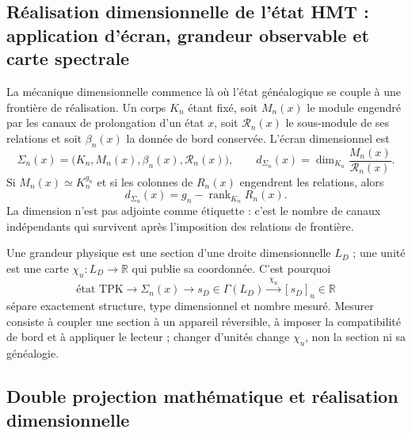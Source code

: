 {\subsection{Réalisation dimensionnelle de l'état HMT : application d'écran, grandeur observable et carte spectrale}

La mécanique dimensionnelle commence là où l'état généalogique se couple à une
frontière de réalisation. Un corps \(K_n\) étant fixé, soit \(M_n(x)\) le module
engendré par les canaux de prolongation d'un état \(x\), soit
\(\mathcal R_n(x)\) le sous-module de ses relations et soit \(\beta_n(x)\) la
donnée de bord conservée. L'écran dimensionnel est
\begin{equation}
\Sigma_n(x)=\bigl(K_n,M_n(x),\beta_n(x),\mathcal R_n(x)\bigr),
\qquad
d_{\Sigma_n}(x)=\dim_{K_n}\frac{M_n(x)}{\mathcal R_n(x)}.
\label{p12-83-c3-s1:eq:md-screen}
\end{equation}
Si \(M_n(x)\simeq K_n^{g_n}\) et si les colonnes de \(R_n(x)\) engendrent les
relations, alors
\begin{equation}
\boxed{d_{\Sigma_n}(x)=g_n-\operatorname{rank}_{K_n}R_n(x).}
\label{p12-83-c3-s1:eq:md-rank}
\end{equation}
La dimension n'est pas adjointe comme étiquette : c'est le nombre de canaux
indépendants qui survivent après l'imposition des relations de frontière.

Une grandeur physique est une section d'une droite dimensionnelle \(L_D\) ; une
unité est une carte \(\chi_u:L_D\to\mathbb R\) qui publie sa coordonnée.
C'est pourquoi
\begin{equation}
\text{état TPK}\longrightarrow\Sigma_n(x)
\longrightarrow s_D\in\Gamma(L_D)
\xrightarrow{\;\chi_u\;}[s_D]_u\in\mathbb R
\label{p12-83-c3-s1:eq:md-measurement-chain}
\end{equation}
sépare exactement structure, type dimensionnel et nombre mesuré. Mesurer
consiste à coupler une section à un appareil réversible, à imposer la
compatibilité de bord et à appliquer le lecteur ; changer d'unités change
\(\chi_u\), non la section ni sa généalogie.

\subsection{Double projection mathématique et réalisation dimensionnelle}

}
